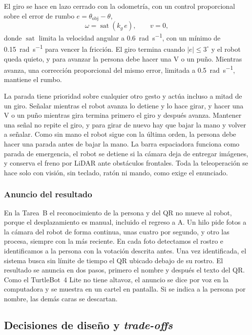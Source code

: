 \documentclass[11pt,a4paper]{article}
\begin{document}
El giro se hace en lazo cerrado con la odometría, con un control proporcional sobre el error de rumbo $e = \theta_{\mathrm{obj}} - \theta$,
\begin{equation}
  \omega = \operatorname{sat}\!\left(k_g\, e\right), \qquad v = 0,
\end{equation}
donde $\operatorname{sat}$ limita la velocidad angular a \SI{0,6}{\radian\per\second}, con un mínimo de \SI{0,15}{\radian\per\second} para vencer la fricción. El giro termina cuando $\lvert e\rvert \le 3^\circ$ y el robot queda quieto, y para avanzar la persona debe hacer una V o un puño. Mientras avanza, una corrección proporcional del mismo error, limitada a \SI{0,5}{\radian\per\second}, mantiene el rumbo.

La parada tiene prioridad sobre cualquier otro gesto y actúa incluso a mitad de un giro. Señalar mientras el robot avanza lo detiene y lo hace girar, y hacer una V o un puño mientras gira termina primero el giro y después avanza. Mantener una señal no repite el giro, y para girar de nuevo hay que bajar la mano y volver a señalar. Como sin mano el robot sigue con la última orden, la persona debe hacer una parada antes de bajar la mano. La barra espaciadora funciona como parada de emergencia, el robot se detiene si la cámara deja de entregar imágenes, y conserva el freno por LiDAR ante obstáculos frontales. Toda la teleoperación se hace solo con visión, sin teclado, ratón ni mando, como exige el enunciado.

\subsubsection{Anuncio del resultado}

En la Tarea~B el reconocimiento de la persona y del QR no mueve al robot, porque el desplazamiento es manual, incluido el regreso a A. Un hilo pide fotos a la cámara del robot de forma continua, unas cuatro por segundo, y otro las procesa, siempre con la más reciente. En cada foto detectamos el rostro e identificamos a la persona con la votación descrita antes. Una vez identificada, el sistema busca sin límite de tiempo el QR ubicado debajo de su rostro. El resultado se anuncia en dos pasos, primero el nombre y después el texto del QR. Como el TurtleBot~4 Lite no tiene altavoz, el anuncio se dice por voz en la computadora y se muestra en un cartel en pantalla. Si se indica a la persona por nombre, las demás caras se descartan.

\subsection{Decisiones de diseño y \textit{trade-offs}}
\end{document}
